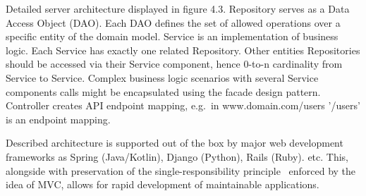 Detailed server architecture displayed in figure 4.3.
Repository serves as a Data Access Object (DAO).
Each DAO defines the set of allowed operations over a specific entity of the domain model.
Service is an implementation of business logic.
Each Service has exactly one related Repository.
Other entities Repositories should be accessed via their Service component, hence 0-to-n cardinality from Service to Service.
Complex business logic scenarios with several Service components calls might be encapsulated using the facade design pattern.
Controller creates API endpoint mapping, e.g.\ in www.domain.com/users '/users' is an endpoint mapping.

Described architecture is supported out of the box by major web development frameworks
as Spring (Java/Kotlin), Django (Python), Rails (Ruby).\cite{spring,django,ruby} etc.
This, alongside with preservation of the single-responsibility principle~\cite{wiki-srp} enforced by the idea of MVC,
allows for rapid development of maintainable applications.